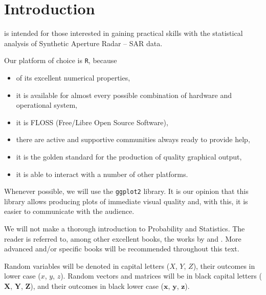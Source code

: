 \chapter{Introduction}\label{Chapter:Introduction}

 is intended for those interested in gaining practical skills with the statistical analysis of Synthetic Aperture Radar -- SAR data.

Our platform of choice is \texttt R, because
\begin{itemize}
\item of its excellent numerical properties\cite{AlmironSilvaMM:2009,OctaveScilabMatlabCAM},
\item it is available for almost every possible combination of hardware and operational system,
\item it is FLOSS (Free/Libre Open Source Software),
\item there are active and supportive communities always ready to provide help,
\item it is the golden standard for the production of quality graphical output,
\item it is able to interact with a number of other platforms.
\end{itemize}

Whenever possible, we will use the \texttt{ggplot2} library\cite{HitchhikerGuideGGPLO2,ggplot2Wickman}.
It is our opinion that this library allows producing plots of immediate visual quality and, with this, it is easier to communicate with the audience.

We will not make a thorough introduction to Probability and Statistics.
The reader is referred to, among other excellent books, the works by
\citet{BickelDocksum77} and
\citet{ModernIntroProbStat:Dekkingetal:2005}.
More advanced and/or specific books will be recommended throughout this text.


Random variables will be denoted in capital letters ($X$, $Y$, $Z$),
their outcomes in lower case ($x$, $y$, $z$).
Random vectors and matrices will be in black capital letters ($\bm X$, $\bm Y$, $\bm Z$), and their outcomes in black lower case ($\bm x$, $\bm y$, $\bm z$).


